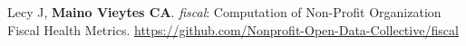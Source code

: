 




\begin{cvskills}

  \cvskill
    {} %
    {Lecy J, \textbf{Maino Vieytes CA}. \textit{fiscal}: Computation of Non-Profit Organization Fiscal Health Metrics. \textcolor{navyblue}{\underline{\href{https://github.com/Nonprofit-Open-Data-Collective/fiscal }{https://github.com/Nonprofit-Open-Data-Collective/fiscal}}}}%


  \end{cvskills}